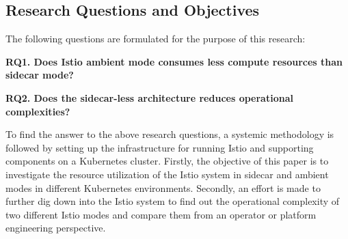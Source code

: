 \subsection{Research Questions and Objectives}
The following questions are formulated for the purpose of this research: 

\textbf{RQ1. Does Istio ambient mode consumes less compute resources than sidecar mode?}

\textbf{RQ2. Does the sidecar-less architecture reduces operational complexities?}

To find the answer to the above research questions, a systemic methodology is followed by setting up the infrastructure for running Istio and supporting components on a Kubernetes cluster. Firstly, the objective of this paper is to investigate the resource utilization of the Istio system in sidecar and ambient modes in different Kubernetes environments. Secondly, an effort is made to further dig down into the Istio system to find out the operational complexity of two different Istio modes and compare them from an operator or platform engineering perspective.
